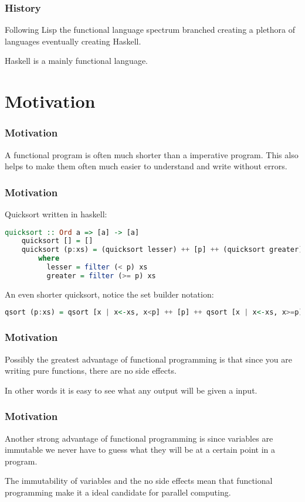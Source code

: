 \documentclass[presentation.tex]{subfiles}
\begin{document}
\begin{frame}
  \frametitle{History}
  Following Lisp the functional language spectrum branched creating a plethora of languages eventually creating Haskell.

  \vspace{\baselineskip}
  Haskell is a mainly functional language.
\end{frame}

\section{Motivation}
\begin{frame}
  \frametitle{Motivation}
  A functional program is often much shorter than a imperative program. This also helps to make them often much easier to understand and write without errors.
\end{frame}


\begin{frame}[fragile]
  \frametitle{Motivation}
  Quicksort written in haskell:
  \begin{lstlisting}[language=Haskell]
    quicksort :: Ord a => [a] -> [a]
    quicksort [] = []
    quicksort (p:xs) = (quicksort lesser) ++ [p] ++ (quicksort greater)
        where
          lesser = filter (< p) xs
          greater = filter (>= p) xs
  \end{lstlisting}

  \vspace{\baselineskip}
  An even shorter quicksort, notice the set builder notation:
  \begin{lstlisting}[language=Haskell]
    qsort (p:xs) = qsort [x | x<-xs, x<p] ++ [p] ++ qsort [x | x<-xs, x>=p]
  \end{lstlisting}
\end{frame}


\begin{frame}
  \frametitle{Motivation}
  Possibly the greatest advantage of functional programming is that since you are writing pure functions, there are no side effects.

  \vspace{\baselineskip}
  In other words it is easy to see what any output will be given a input.
\end{frame}


\begin{frame}
  \frametitle{Motivation}
  Another strong advantage of functional programming is since variables are immutable we never have to guess what they will be at a certain point in a program.

  \vspace{\baselineskip}
  The immutability of variables and the no side effects mean that functional programming make it a ideal candidate for parallel computing.
\end{frame}
\end{document}

